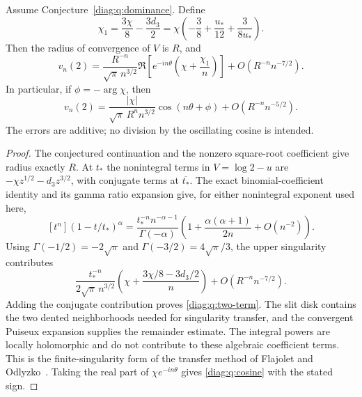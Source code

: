 \begin{theorem}
\label{diag:q:conditional-asymptotic}
Assume Conjecture~\ref{diag:q:dominance}.  Define
\begin{equation}\label{diag:q:c1}
 \chi_1=\frac{3\chi}{8}-\frac{3d_3}{2}
     =\chi\left(-\frac38+\frac{u_*}{12}+\frac3{8u_*}\right).
\end{equation}
Then the radius of convergence of $V$ is $R$, and
\begin{equation}\label{diag:q:two-term}
 v_n(2)=\frac{R^{-n}}{\sqrt\pi\,n^{3/2}}
       \Re\!\left[e^{-in\theta}
                    \left(\chi+\frac{\chi_1}{n}\right)\right]
       +O\!\left(R^{-n}n^{-7/2}\right).
\end{equation}
In particular, if $\phi=-\arg \chi$, then
\begin{equation}\label{diag:q:cosine}
 v_n(2)=\frac{|\chi|}{\sqrt\pi\,R^n n^{3/2}}
                 \cos(n\theta+\phi)
          +O\!\left(R^{-n}n^{-5/2}\right).
\end{equation}
The errors are additive; no division by the oscillating cosine is intended.
\end{theorem}

\begin{proof}
The conjectured continuation and the nonzero square-root coefficient
give radius exactly $R$.  At $t_*$ the nonintegral terms in $V=\log2-u$
are $-\chi z^{1/2}-d_3z^{3/2}$, with conjugate terms at
$\overline{t_*}$.  The exact binomial-coefficient identity and its gamma
ratio expansion give, for either nonintegral exponent used here,
\[
 [t^n](1-t/t_*)^\alpha
 =\frac{t_*^{-n}n^{-\alpha-1}}{\Gamma(-\alpha)}
   \left(1+\frac{\alpha(\alpha+1)}{2n}+O(n^{-2})\right).
\]
Using $\Gamma(-1/2)=-2\sqrt\pi$ and
$\Gamma(-3/2)=4\sqrt\pi/3$, the upper singularity contributes
\[
 \frac{t_*^{-n}}{2\sqrt\pi\,n^{3/2}}
 \left(\chi+\frac{3\chi/8-3d_3/2}{n}\right)
 +O(R^{-n}n^{-7/2}).
\]
Adding the conjugate contribution proves \eqref{diag:q:two-term}.
The slit disk contains the two dented neighborhoods needed for
singularity transfer, and the convergent Puiseux expansion supplies the
remainder estimate.  The integral powers are locally holomorphic and do
not contribute to these algebraic coefficient terms.  This is the
finite-singularity form of the transfer method of
Flajolet and Odlyzko~\cite{FlajoletOdlyzko1990}.  Taking the real part of
$\chi e^{-in\theta}$ gives \eqref{diag:q:cosine} with the stated sign.
\end{proof}

